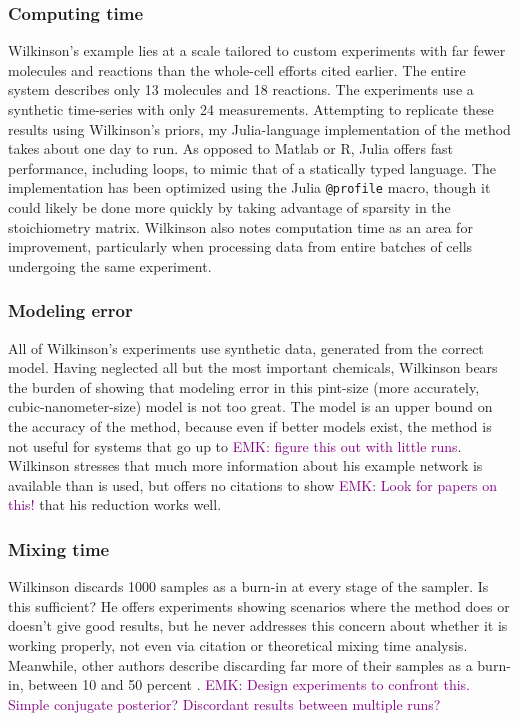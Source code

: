 \documentclass{article}
\newcommand\EMK[1]{\textcolor{purple}{EMK: #1}}
\begin{document}
\subsubsection{Computing time}
Wilkinson's example lies at a scale tailored to custom experiments with far fewer molecules and reactions than the whole-cell efforts cited earlier. The entire system describes only 13 molecules and 18 reactions. The experiments use a synthetic time-series with only 24 measurements. Attempting to replicate these results using Wilkinson's priors, my Julia-language implementation of the method takes about one day to run. As opposed to Matlab or R, Julia offers fast performance, including loops, to mimic that of a statically typed language. The implementation has been optimized using the Julia \texttt{@profile} macro, though it could likely be done more quickly by taking advantage of sparsity in the stoichiometry matrix. Wilkinson also notes computation time as an area for improvement, particularly when processing data from entire batches of cells undergoing the same experiment.

\subsubsection{Modeling error}
All of Wilkinson's experiments use synthetic data, generated from the correct model. Having neglected all but the most important chemicals, Wilkinson bears the burden of showing that modeling error in this pint-size (more accurately, cubic-nanometer-size) model is not too great. The model is an upper bound on the accuracy of the method, because even if better models exist, the method is not useful for systems that go up to \EMK{figure this out with little runs}. Wilkinson stresses that much more information about his example network is available than is used, but offers no citations to show \EMK{Look for papers on this!} that his reduction works well.

\subsubsection{Mixing time}
Wilkinson discards 1000 samples as a burn-in at every stage of the sampler. Is this sufficient? He offers experiments showing scenarios where the method does or doesn't give good results, but he never addresses this concern about whether it is working properly, not even via citation or theoretical mixing time analysis. Meanwhile, other authors describe discarding far more of their samples as a burn-in, between 10 and 50 percent \cite{gupta2014comparison,zechner2014scalable}.  \EMK{Design experiments to confront this. Simple conjugate posterior? Discordant results between multiple runs?}
\end{document}
